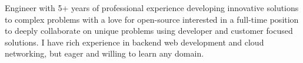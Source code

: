 

\begin{cvparagraph}

Engineer with 5+ years of professional experience developing innovative solutions to complex problems with a love for open-source interested in a full-time position to deeply collaborate on unique problems using developer and customer focused solutions. I have rich experience in backend web development and cloud networking, but eager and willing to learn any domain.

\end{cvparagraph}
